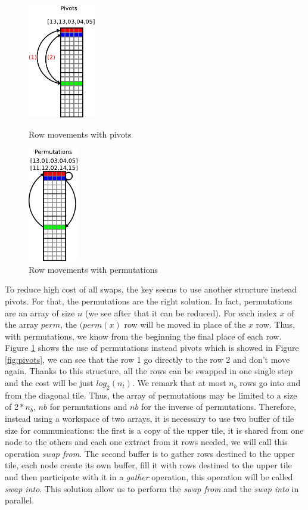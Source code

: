 \begin{figure}[!ht]
\begin{minipage}[!ht]{.4\textwidth}
\centering
\includegraphics[height=5cm]{figures/pivots.pdf}
\caption{Row movements with pivots\label{fig:pivots}}
\end{minipage} \hfill
\begin{minipage}[!ht]{.4\textwidth}
\centering
\includegraphics[height=5cm]{figures/permutations.pdf}
\caption{Row movements with permutations\label{fig:permutations}}
\end{minipage}
\end{figure}

To reduce high cost of all swaps, the key seems to use another structure instead pivots. For that, the permutations are the right solution. In fact, permutations are an array of size $n$ (we see after that it can be reduced). For each index $x$ of the array $perm$, the $(perm(x)$ row will be moved in place of the $x$ row. Thus, with permutations, we know from the beginning the final place of each row. 
Figure \ref{fig:permutations} shows the use of permutations instead pivots which is showed in Figure \ref{fig:pivots}, we can see that the row 1 go directly to the row 2 and don't move again.
Thanks to this structure, all the rows can be swapped in one single step and the cost will be just $log_2(n_t)$. 
We remark that at most $n_b$ rows go into and from the diagonal tile. Thus, the array of permutations may be limited to a size of $2*n_b$, $nb$ for permutations and $nb$ for the inverse of permutations. Therefore, instead using a workspace of two arrays, it is necessary to use two buffer of tile size for communications: the first is a copy of the upper tile, it is shared from one node to the others and each one extract from it rows needed, we will call this operation \emph{swap from}. The second buffer is to gather rows destined to the upper tile, each node create its own buffer, fill it with rows destined to the upper tile and then participate with it in a \textit{gather} operation, this operation will be called \emph{swap into}. This solution allow us to perform the \emph{swap from} and the \emph{swap into} in parallel.

